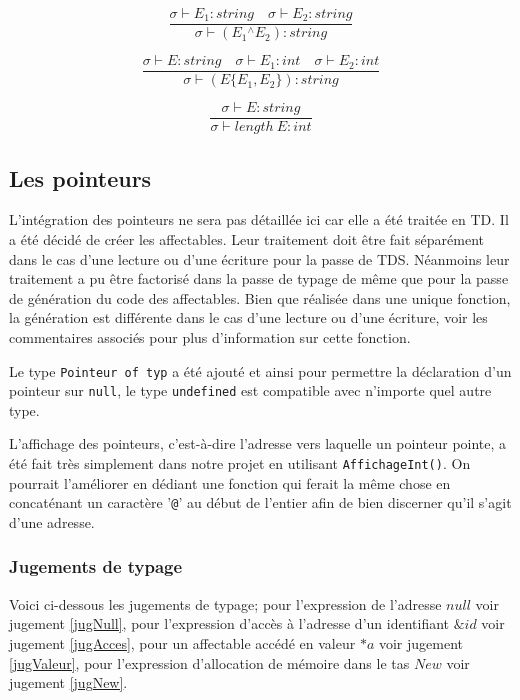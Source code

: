 \documentclass[11pt,a4paper]{article}
\begin{document}
\begin{equation}
	\label{jugConcat}
	\frac{\sigma \vdash E_1 : string \quad \sigma \vdash E_2 : string}{\sigma \vdash (E_1 {}^\wedge E_2) : string}
\end{equation}

\begin{equation}
	\label{jugSousChaine}
	\frac{\sigma \vdash E : string \quad \sigma \vdash E_1 : int \quad \sigma \vdash E_2 : int}{\sigma \vdash (E\{E_1, E_2\}) : string}
\end{equation}

\begin{equation}
	\label{jugTaille}
	\frac{\sigma \vdash E : string}{\sigma \vdash length ~ E : int}
\end{equation}

\subsection{Les pointeurs}

L'intégration des pointeurs ne sera pas détaillée ici car elle a été traitée en TD. Il a été décidé de créer les affectables. Leur traitement doit être fait séparément dans le cas d'une lecture ou d'une écriture pour la passe de TDS. Néanmoins leur traitement a pu être factorisé dans la passe de typage de même que pour la passe de génération du code des affectables. Bien que réalisée dans une unique fonction, la génération est différente dans le cas d'une lecture ou d'une écriture, voir les commentaires associés pour plus d'information sur cette fonction.

Le type \texttt{Pointeur of typ} a été ajouté et ainsi pour permettre la déclaration d'un pointeur sur \texttt{null}, le type \texttt{undefined} est compatible avec n'importe quel autre type.

L'affichage des pointeurs, c'est-à-dire l'adresse vers laquelle un pointeur pointe, a été fait très simplement dans notre projet en utilisant \texttt{AffichageInt()}. On pourrait l'améliorer en dédiant une fonction qui ferait la même chose en concaténant un caractère '\texttt{@}' au début de l'entier afin de bien discerner qu'il s'agit d'une adresse.

\subsubsection*{Jugements de typage}

Voici ci-dessous les jugements de typage; pour l'expression de l'adresse $null$ voir jugement \ref{jugNull}, pour l'expression d'accès à l'adresse d'un identifiant $\&id$ voir jugement \ref{jugAcces}, pour un affectable accédé en valeur $*a$ voir jugement \ref{jugValeur}, pour l'expression d'allocation de mémoire dans le tas $New$ voir jugement \ref{jugNew}.
\end{document}
